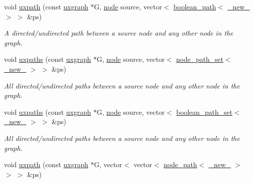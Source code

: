 \begin{DoxyCompactItemize}
void \hyperlink{namespacelgraph_1_1traversal_ad5c153d51abaa62dc1da6fe47302fabf}{uxpath} (const \hyperlink{classlgraph_1_1utils_1_1uxgraph}{uxgraph} $\ast$G, \hyperlink{namespacelgraph_1_1utils_a7bd66ede3805ef121bc2835bd48de0cf}{node} source, vector$<$ \hyperlink{classlgraph_1_1utils_1_1boolean__path}{boolean\+\_\+path}$<$ \hyperlink{namespacelgraph_1_1utils_a2c84bfde888c42ab3ad6b2cb8a364240}{\+\_\+new\+\_\+} $>$ $>$ \&ps)
\begin{DoxyCompactList}\small\item\em A directed/undirected path between a source node and any other node in the graph. \end{DoxyCompactList}\item 
void \hyperlink{namespacelgraph_1_1traversal_a9761cc456130e95d8a883d14854a0c44}{uxpaths} (const \hyperlink{classlgraph_1_1utils_1_1uxgraph}{uxgraph} $\ast$G, \hyperlink{namespacelgraph_1_1utils_a7bd66ede3805ef121bc2835bd48de0cf}{node} source, vector$<$ \hyperlink{namespacelgraph_1_1utils_a723c115f9865edfab11a90377b9abef4}{node\+\_\+path\+\_\+set}$<$ \hyperlink{namespacelgraph_1_1utils_a2c84bfde888c42ab3ad6b2cb8a364240}{\+\_\+new\+\_\+} $>$ $>$ \&ps)
\begin{DoxyCompactList}\small\item\em All directed/undirected paths between a source node and any other node in the graph. \end{DoxyCompactList}\item 
void \hyperlink{namespacelgraph_1_1traversal_a8f2b9cea0611501020f210a067878f2c}{uxpaths} (const \hyperlink{classlgraph_1_1utils_1_1uxgraph}{uxgraph} $\ast$G, \hyperlink{namespacelgraph_1_1utils_a7bd66ede3805ef121bc2835bd48de0cf}{node} source, vector$<$ \hyperlink{namespacelgraph_1_1utils_aaf50131e15d771a45620336d6e7a77f8}{boolean\+\_\+path\+\_\+set}$<$ \hyperlink{namespacelgraph_1_1utils_a2c84bfde888c42ab3ad6b2cb8a364240}{\+\_\+new\+\_\+} $>$ $>$ \&ps)
\begin{DoxyCompactList}\small\item\em All directed/undirected paths between a source node and any other node in the graph. \end{DoxyCompactList}\item 
void \hyperlink{namespacelgraph_1_1traversal_a42e351d7e0c1943141917348116f5f32}{uxpath} (const \hyperlink{classlgraph_1_1utils_1_1uxgraph}{uxgraph} $\ast$G, vector$<$ vector$<$ \hyperlink{classlgraph_1_1utils_1_1node__path}{node\+\_\+path}$<$ \hyperlink{namespacelgraph_1_1utils_a2c84bfde888c42ab3ad6b2cb8a364240}{\+\_\+new\+\_\+} $>$ $>$ $>$ \&ps)

\end{DoxyCompactItemize}
